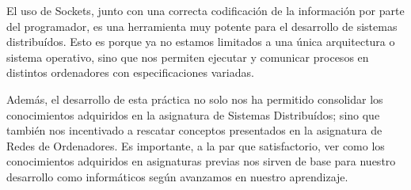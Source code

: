 \documentclass[]{article}
\begin{document}
El uso de Sockets, junto con una correcta codificación de la información por parte del programador, es una herramienta muy potente para el desarrollo de sistemas distribuídos. Esto es porque ya no estamos limitados a una única arquitectura o sistema operativo, sino que nos permiten ejecutar y comunicar procesos en distintos ordenadores con especificaciones variadas. 

Además, el desarrollo de esta práctica no solo nos ha permitido consolidar los conocimientos adquiridos en la asignatura de Sistemas Distribuídos; sino que también nos incentivado a rescatar conceptos presentados en la asignatura de Redes de Ordenadores. Es importante, a la par que satisfactorio, ver como los conocimientos adquiridos en asignaturas previas nos sirven de base para nuestro desarrollo como informáticos según avanzamos en nuestro aprendizaje. 
\end{document}
